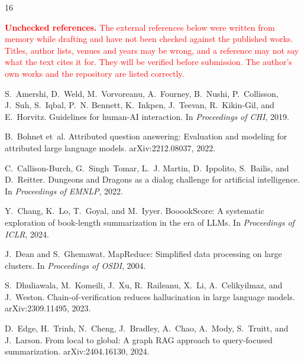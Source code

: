 \documentclass[11pt]{article}
\begin{document}

\begin{thebibliography}{16}

\item[] \textcolor{red}{\textbf{Unchecked references.} The external references below were
written from memory while drafting and have not been checked against the published
works. Titles, author lists, venues and years may be wrong, and a reference may not
say what the text cites it for. They will be verified before submission. The author's
own works and the repository are listed correctly.}

S.~Amershi, D.~Weld, M.~Vorvoreanu, A.~Fourney, B.~Nushi, P.~Collisson, J.~Suh,
S.~Iqbal, P.~N. Bennett, K.~Inkpen, J.~Teevan, R.~Kikin-Gil, and E.~Horvitz.
\newblock Guidelines for human-AI interaction.
\newblock In \emph{Proceedings of CHI}, 2019.

B.~Bohnet et~al.
\newblock Attributed question answering: Evaluation and modeling for attributed large
language models.
\newblock arXiv:2212.08037, 2022.

C.~Callison-Burch, G.~Singh~Tomar, L.~J. Martin, D.~Ippolito, S.~Bailis, and D.~Reitter.
\newblock Dungeons and Dragons as a dialog challenge for artificial intelligence.
\newblock In \emph{Proceedings of EMNLP}, 2022.

Y.~Chang, K.~Lo, T.~Goyal, and M.~Iyyer.
\newblock BooookScore: A systematic exploration of book-length summarization in the era
of LLMs.
\newblock In \emph{Proceedings of ICLR}, 2024.

J.~Dean and S.~Ghemawat.
\newblock MapReduce: Simplified data processing on large clusters.
\newblock In \emph{Proceedings of OSDI}, 2004.

S.~Dhuliawala, M.~Komeili, J.~Xu, R.~Raileanu, X.~Li, A.~Celikyilmaz, and J.~Weston.
\newblock Chain-of-verification reduces hallucination in large language models.
\newblock arXiv:2309.11495, 2023.

D.~Edge, H.~Trinh, N.~Cheng, J.~Bradley, A.~Chao, A.~Mody, S.~Truitt, and J.~Larson.
\newblock From local to global: A graph RAG approach to query-focused summarization.
\newblock arXiv:2404.16130, 2024.


\end{thebibliography}
\end{document}

